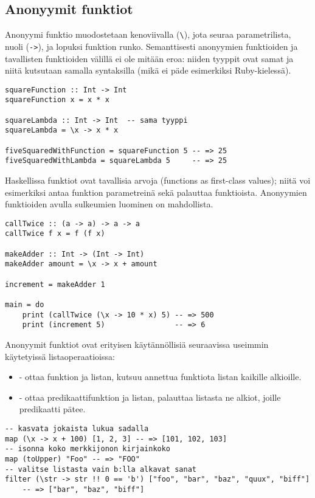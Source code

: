 \subsection{Anonyymit funktiot}
Anonyymi funktio muodostetaan kenoviivalla (\texttt{\textbackslash}), jota seuraa
parametrilista, nuoli (\texttt{->}), ja lopuksi funktion runko.
Semanttisesti anonyymien funktioiden ja tavallisten funktioiden välillä ei ole mitään eroa:
niiden tyyppit ovat samat ja niitä kutsutaan samalla syntaksilla (mikä ei päde esimerkiksi Ruby-kielessä).
\begin{verbatim}
squareFunction :: Int -> Int
squareFunction x = x * x

squareLambda :: Int -> Int  -- sama tyyppi
squareLambda = \x -> x * x

fiveSquaredWithFunction = squareFunction 5 -- => 25
fiveSquaredWithLambda = squareLambda 5     -- => 25
\end{verbatim}
Haskellissa funktiot ovat tavallisia arvoja (functions as first-class values);
niitä voi esimerkiksi antaa funktion parametreinä sekä palauttaa funktioista.
Anonyymien funktioiden avulla sulkeumien luominen on mahdollista.

\begin{verbatim}
callTwice :: (a -> a) -> a -> a
callTwice f x = f (f x)

makeAdder :: Int -> (Int -> Int)
makeAdder amount = \x -> x + amount

increment = makeAdder 1

main = do
    print (callTwice (\x -> 10 * x) 5) -- => 500
    print (increment 5)                -- => 6
\end{verbatim}
Anonyymit funktiot ovat erityisen käytännöllisiä seuraavissa useimmin käytetyissä listaoperaatioissa:
\begin{itemize}
    \item {} - ottaa funktion ja listan, kutsuu annettua funktiota listan kaikille alkioille.
    \item {} - ottaa predikaattifunktion ja listan, palauttaa listasta ne alkiot, joille predikaatti pätee.
\end{itemize}
\begin{verbatim}
-- kasvata jokaista lukua sadalla
map (\x -> x + 100) [1, 2, 3] -- => [101, 102, 103]
-- isonna koko merkkijonon kirjainkoko
map (toUpper) "Foo" -- => "FOO"
-- valitse listasta vain b:lla alkavat sanat
filter (\str -> str !! 0 == 'b') ["foo", "bar", "baz", "quux", "biff"]
    -- => ["bar", "baz", "biff"]
\end{verbatim}

